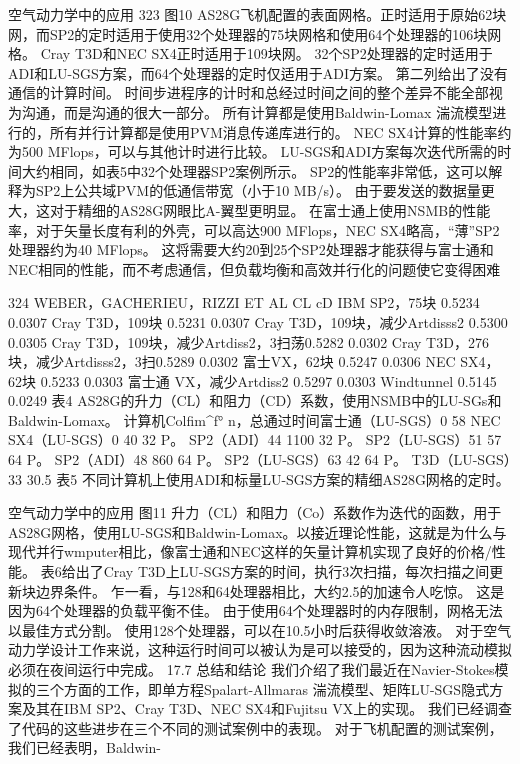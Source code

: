 \documentclass[UTF8,11pt,a4paper,openany,fontset=fandol]{ctexbook}
\begin{document}
空气动力学中的应用 323 图10 AS28G飞机配置的表面网格。正时适用于原始62块网，而SP2的定时适用于使用32个处理器的75块网格和使用64个处理器的106块网格。 Cray T3D和NEC SX4正时适用于109块网。 32个SP2处理器的定时适用于ADI和LU-SGS方案，而64个处理器的定时仅适用于ADI方案。 第二列给出了没有通信的计算时间。 时间步进程序的计时和总经过时间之间的整个差异不能全部视为沟通，而是沟通的很大一部分。 所有计算都是使用Baldwin-Lomax 湍流模型进行的，所有并行计算都是使用PVM消息传递库进行的。 NEC SX4计算的性能率约为500 MFlops，可以与其他计时进行比较。 LU-SGS和ADI方案每次迭代所需的时间大约相同，如表5中32个处理器SP2案例所示。 SP2的性能率非常低，这可以解释为SP2上公共域PVM的低通信带宽（小于10 MB/s）。 由于要发送的数据量更大，这对于精细的AS28G网眼比A-翼型更明显。 在富士通上使用NSMB的性能率，对于矢量长度有利的外壳，可以高达900 MFlops，NEC SX4略高，“薄”SP2处理器约为40 MFlops。 这将需要大约20到25个SP2处理器才能获得与富士通和NEC相同的性能，而不考虑通信，但负载均衡和高效并行化的问题使它变得困难

324 WEBER，GACHERIEU，RIZZI ET AL CL cD IBM SP2，75块 0.5234 0.0307 Cray T3D，109块 0.5231 0.0307 Cray T3D，109块，减少Artdisss2 0.5300 0.0305 Cray T3D，109块，减少Artdiss2，3扫荡0.5282 0.0302 Cray T3D，276块，减少Artdisss2，3扫0.5289 0.0302 富士VX，62块 0.5247 0.0306 NEC SX4，62块 0.5233 0.0303 富士通 VX，减少Artdiss2 0.5297 0.0303 Windtunnel 0.5145 0.0249 表4 AS28G的升力（CL）和阻力（CD）系数，使用NSMB中的LU-SGs和Baldwin-Lomax。 计算机Colfim\textasciicircum{}f° n，总通过时间富士通（LU-SGS）0 58 NEC SX4（LU-SGS）0 40 32 P。 SP2（ADI）44 1100 32 P。 SP2（LU-SGS）51 57 64 P。 SP2（ADI）48 860 64 P。 SP2（LU-SGS）63 42 64 P。 T3D（LU-SGS）33 30.5 表5 不同计算机上使用ADI和标量LU-SGS方案的精细AS28G网格的定时。

空气动力学中的应用 图11 升力（CL）和阻力（Co）系数作为迭代的函数，用于AS28G网格，使用LU-SGS和Baldwin-Lomax。以接近理论性能，这就是为什么与现代并行wmputer相比，像富士通和NEC这样的矢量计算机实现了良好的价格/性能。 表6给出了Cray T3D上LU-SGS方案的时间，执行3次扫描，每次扫描之间更新块边界条件。 乍一看，与128和64处理器相比，大约2.5的加速令人吃惊。 这是因为64个处理器的负载平衡不佳。 由于使用64个处理器时的内存限制，网格无法以最佳方式分割。 使用128个处理器，可以在10.5小时后获得收敛溶液。 对于空气动力学设计工作来说，这种运行时间可以被认为是可以接受的，因为这种流动模拟必须在夜间运行中完成。 17.7 总结和结论 我们介绍了我们最近在Navier-Stokes模拟的三个方面的工作，即单方程Spalart-Allmaras 湍流模型、矩阵LU-SGS隐式方案及其在IBM SP2、Cray T3D、NEC SX4和Fujitsu VX上的实现。 我们已经调查了代码的这些进步在三个不同的测试案例中的表现。 对于飞机配置的测试案例，我们已经表明，Baldwin-
\end{document}
